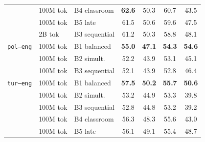 \begin{table}[t]
\begin{minipage}[t]{0.49\linewidth}
\begin{tabular}{ll l cccc}
 & 100M tok & B4 classroom & \cellcolor[rgb]{0.869,1.000,0.869} \textbf{62.6} & \cellcolor[rgb]{0.996,1.000,0.996} 50.3 & \cellcolor[rgb]{0.858,1.000,0.858} 60.7 & \cellcolor[rgb]{1.000,0.928,0.928} 43.5 \\
 & 100M tok & B5 late & \cellcolor[rgb]{0.880,1.000,0.880} 61.5 & \cellcolor[rgb]{0.992,1.000,0.992} 50.6 & \cellcolor[rgb]{0.873,1.000,0.873} 59.6 & \cellcolor[rgb]{1.000,0.972,0.972} 47.5 \\
\addlinespace[1.5pt]
 & 2B tok & B3 sequential & \cellcolor[rgb]{0.883,1.000,0.883} 61.2 & \cellcolor[rgb]{0.996,1.000,0.996} 50.3 & \cellcolor[rgb]{0.884,1.000,0.884} 58.8 & \cellcolor[rgb]{1.000,0.979,0.979} 48.1 \\
\midrule
\texttt{pol--eng} & 100M tok & B1 balanced & \cellcolor[rgb]{0.948,1.000,0.948} \textbf{55.0} & \cellcolor[rgb]{1.000,0.972,0.972} \textbf{47.1} & \cellcolor[rgb]{0.943,1.000,0.943} \textbf{54.3} & \cellcolor[rgb]{0.906,1.000,0.906} \textbf{54.6} \\
 & 100M tok & B2 simult. & \cellcolor[rgb]{0.977,1.000,0.977} 52.2 & \cellcolor[rgb]{1.000,0.941,0.941} 43.9 & \cellcolor[rgb]{0.959,1.000,0.959} 53.1 & \cellcolor[rgb]{1.000,0.946,0.946} 45.1 \\
 & 100M tok & B3 sequential & \cellcolor[rgb]{0.978,1.000,0.978} 52.1 & \cellcolor[rgb]{1.000,0.941,0.941} 43.9 & \cellcolor[rgb]{0.963,1.000,0.963} 52.8 & \cellcolor[rgb]{1.000,0.960,0.960} 46.4 \\
\midrule
\texttt{tur--eng} & 100M tok & B1 balanced & \cellcolor[rgb]{0.922,1.000,0.922} \textbf{57.5} & \cellcolor[rgb]{0.997,1.000,0.997} \textbf{50.2} & \cellcolor[rgb]{0.925,1.000,0.925} \textbf{55.7} & \cellcolor[rgb]{0.988,1.000,0.988} \textbf{50.6} \\
 & 100M tok & B2 simult. & \cellcolor[rgb]{0.967,1.000,0.967} 53.2 & \cellcolor[rgb]{1.000,0.951,0.951} 44.9 & \cellcolor[rgb]{0.956,1.000,0.956} 53.3 & \cellcolor[rgb]{1.000,0.888,0.888} 39.8 \\
 & 100M tok & B3 sequential & \cellcolor[rgb]{0.971,1.000,0.971} 52.8 & \cellcolor[rgb]{1.000,0.950,0.950} 44.8 & \cellcolor[rgb]{0.958,1.000,0.958} 53.2 & \cellcolor[rgb]{1.000,0.881,0.881} 39.2 \\
 & 100M tok & B4 classroom & \cellcolor[rgb]{0.934,1.000,0.934} 56.3 & \cellcolor[rgb]{1.000,0.984,0.984} 48.3 & \cellcolor[rgb]{0.926,1.000,0.926} 55.6 & \cellcolor[rgb]{1.000,0.923,0.923} 43.0 \\
 & 100M tok & B5 late & \cellcolor[rgb]{0.936,1.000,0.936} 56.1 & \cellcolor[rgb]{1.000,0.991,0.991} 49.1 & \cellcolor[rgb]{0.929,1.000,0.929} 55.4 & \cellcolor[rgb]{1.000,0.986,0.986} 48.7 \\

\end{tabular}
\end{minipage}
\end{table}
